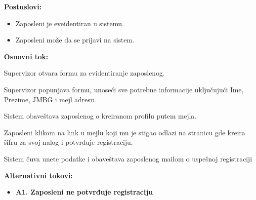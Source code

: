 \documentclass[a4paper]{article}
\begin{document}
\noindent\textbf{Postuslovi:} 
  \begin{itemize}
    \item Zaposleni je eveidentiran u sistemu.
    \item Zaposleni može da se prijavi na sistem.
  \end{itemize}

\noindent\textbf{Osnovni tok:}
  \begin{legal}
    \item Supervizor otvara formu za evidentiranje zaposlenog.
    \item Supervizor popunjava formu, unoseći sve potrebne informacije uključujući Ime, Prezime, JMBG i mejl adresu. 
    \item Sistem obaveštava zaposlenog o kreiranom profilu putem mejla. 
    \item Zaposleni klikom na link u mejlu koji mu je stigao odlazi na stranicu gde kreira šifru za svoj nalog i potvrđuje registraciju.  
    \item Sistem čuva unete podatke i obaveštava zaposlenog mailom o uspešnoj registraciji
  \end{legal}

\noindent\textbf{Alternativni tokovi:} 
\begin{itemize}
  \item \textbf{A1. Zaposleni ne potvrđuje registraciju} 
\end{itemize}
\end{document}
